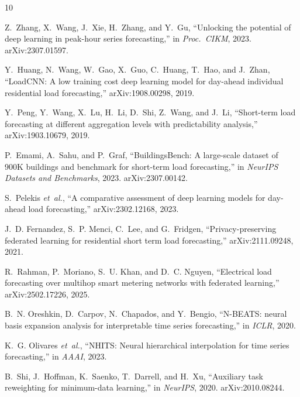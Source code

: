 \documentclass[conference]{IEEEtran}
\begin{document}
\begin{thebibliography}{10}

Z.~Zhang, X.~Wang, J.~Xie, H.~Zhang, and Y.~Gu,
``Unlocking the potential of deep learning in peak-hour series forecasting,''
in \emph{Proc.\ CIKM}, 2023. arXiv:2307.01597.

Y.~Huang, N.~Wang, W.~Gao, X.~Guo, C.~Huang, T.~Hao, and J.~Zhan,
``LoadCNN: A low training cost deep learning model for day-ahead individual residential load forecasting,''
arXiv:1908.00298, 2019.

Y.~Peng, Y.~Wang, X.~Lu, H.~Li, D.~Shi, Z.~Wang, and J.~Li,
``Short-term load forecasting at different aggregation levels with predictability analysis,''
arXiv:1903.10679, 2019.

P.~Emami, A.~Sahu, and P.~Graf,
``BuildingsBench: A large-scale dataset of 900K buildings and benchmark for short-term load forecasting,''
in \emph{NeurIPS Datasets and Benchmarks}, 2023. arXiv:2307.00142.

S.~Pelekis \emph{et~al.},
``A comparative assessment of deep learning models for day-ahead load forecasting,''
arXiv:2302.12168, 2023.

J.~D. Fernandez, S.~P. Menci, C.~Lee, and G.~Fridgen,
``Privacy-preserving federated learning for residential short term load forecasting,''
arXiv:2111.09248, 2021.

R.~Rahman, P.~Moriano, S.~U. Khan, and D.~C. Nguyen,
``Electrical load forecasting over multihop smart metering networks with federated learning,''
arXiv:2502.17226, 2025.

B.~N. Oreshkin, D.~Carpov, N.~Chapados, and Y.~Bengio,
``N-BEATS: neural basis expansion analysis for interpretable time series forecasting,''
in \emph{ICLR}, 2020.

K.~G. Olivares \emph{et~al.},
``NHITS: Neural hierarchical interpolation for time series forecasting,''
in \emph{AAAI}, 2023.

B.~Shi, J.~Hoffman, K.~Saenko, T.~Darrell, and H.~Xu,
``Auxiliary task reweighting for minimum-data learning,''
in \emph{NeurIPS}, 2020. arXiv:2010.08244.

\end{thebibliography}
\end{document}
